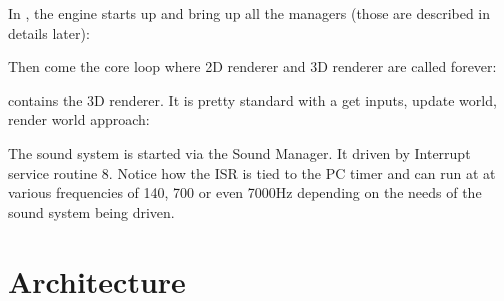 \documentclass[book.tex]{subfiles}
\begin{document}
\par
In , the engine starts up and bring up all the managers (those are described in details later):\\
\par
\begin{minipage}{\textwidth}

\end{minipage}
\par
Then come the core loop where 2D renderer and 3D renderer are called forever:\\
\par
\begin{minipage}{\textwidth}

\end{minipage}
\par
{} contains the 3D renderer. It is pretty standard with a get inputs, update world, render world approach:\\
\par
\begin{minipage}{\textwidth}

\end{minipage}
\par
The sound system is started via the Sound Manager. It driven by Interrupt service routine 8. Notice how the ISR is tied to the PC timer and can run at at various frequencies of 140, 700 or even 7000Hz depending on the needs of the sound system being driven.\\
\par
\begin{minipage}{\textwidth}

\end{minipage}
\par

















\section{Architecture}
\end{document}
